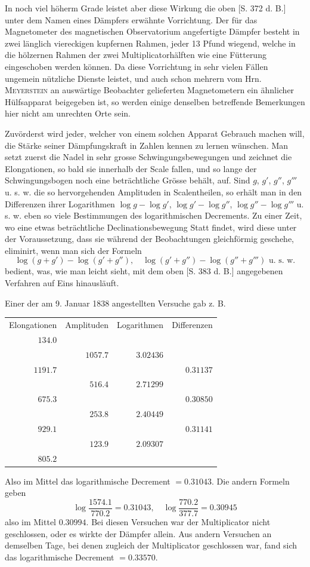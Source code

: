 In noch viel höherm Grade leistet aber diese Wirkung die oben [S. 372 d. B.] unter dem Namen eines Dämpfers erwähnte Vorrichtung. Der für das Magnetometer des magnetischen Observatorium angefertigte Dämpfer besteht in zwei länglich viereckigen kupfernen Rahmen, jeder 13 Pfund wiegend, welche in die hölzernen Rahmen der zwei Multiplicatorhälften wie eine Fütterung eingeschoben werden können. Da diese Vorrichtung in sehr vielen Fällen ungemein nützliche Dienste leistet, und auch schon mehrern vom Hrn. \textsc{Meyerstein} an auswärtige Beobachter gelieferten Magnetometern ein ähnlicher Hülfsapparat beigegeben ist, so werden einige denselben betreffende Bemerkungen hier nicht am unrechten Orte sein.

Zuvörderst wird jeder, welcher von einem solchen Apparat Gebrauch machen will, die Stärke seiner Dämpfungskraft in Zahlen kennen zu lernen wünschen. Man setzt zuerst die Nadel in sehr grosse Schwingungsbewegungen und zeichnet die Elongationen, so bald sie innerhalb der Scale fallen, und so lange der Schwingungsbogen noch eine beträchtliche Grösse behält, auf. Sind $g$, $g'$, $g''$, $g'''$ u. s. w. die so hervorgehenden Amplituden in Scalentheilen, so erhält man in den Differenzen ihrer Logarithmen $\log g-\log g'$, $\log g'-\log g''$, $\log g''-\log g'''$ u. s. w. eben so viele Bestimmungen des logarithmischen Decrements. Zu einer Zeit, wo eine etwas beträchtliche Declinationsbewegung Statt findet, wird diese unter der Voraussetzung, dass sie während der Beobachtungen gleichförmig geschehe, eliminirt, wenn man sich der Formeln
\[
\log(g+g')-\log(g'+g''),\quad \log(g'+g'')-\log(g''+g''')\text{ u. s. w.}
\]
bedient, was, wie man leicht sieht, mit dem oben [S. 383 d. B.] angegebenen Verfahren auf Eins hinausläuft.

Einer der am 9. Januar 1838 angestellten Versuche gab z. B.
\begin{center}
\begin{tabular}{r|r|r|r}
Elongationen&Amplituden&Logarithmen&Differenzen\\
$134.0$&&&\\[-3pt]
&$1057.7$&$3.02436$&\\[-3pt]
$1191.7$&&&$0.31137$\\[-3pt]
&$516.4$&$2.71299$&\\[-3pt]
$675.3$&&&$0.30850$\\[-3pt]
&$253.8$&$2.40449$&\\[-3pt]
$929.1$&&&$0.31141$\\[-3pt]
&$123.9$&$2.09307$&\\[-3pt]
$805.2$&&&
\end{tabular}
\end{center}
Also im Mittel das logarithmische Decrement $=0.31043$. Die andern Formeln geben
\[
\log\frac{1574.1}{770.2}=0.31043,\quad \log\frac{770.2}{377.7}=0.30945
\]
also im Mittel $0.30994$. Bei diesen Versuchen war der Multiplicator nicht geschlossen, oder es wirkte der Dämpfer allein. Aus andern Versuchen an demselben Tage, bei denen zugleich der Multiplicator geschlossen war, fand sich das logarithmische Decrement $=0.33570$.

